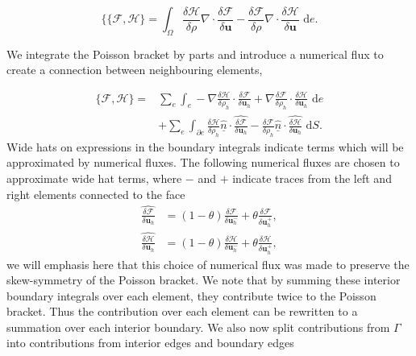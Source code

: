 \documentclass[a4paper,11pt]{article}
\begin{document}
\[ \{  \{ \mathcal{F},  \mathcal{H}\} = \int_\Omega \frac{\delta  \mathcal{H}}{\delta \rho} \nabla \cdot \frac{\delta  \mathcal{F}}{\delta \mathbf{u}} - \frac{\delta  \mathcal{F}}{\delta \rho} \nabla \cdot \frac{\delta  \mathcal{H}}{\delta \mathbf{u}} \text{ d}e.\]

 We integrate the  Poisson bracket by parts and introduce a numerical flux to create a connection between neighbouring elements,

\begin{equation}
\begin{aligned}
 \{ \mathcal{F},  \mathcal{H}\} = & \sum_e \int_e - \nabla \frac{\delta  \mathcal{H}}{\delta \rho_h}\cdot \frac{\delta  \mathcal{F}}{\delta \mathbf{u}_h} + \nabla \frac{\delta  \mathcal{F}}{\delta \rho_h}\cdot \frac{\delta  \mathcal{H}}{\delta \mathbf{u}_h} \text{ d}e \\
 &+ \sum_e \int_{\partial e }  \frac{\delta  \mathcal{H}}{\delta \rho_h}\hat{\underline{n}} \cdot \widehat{\frac{\delta  \mathcal{F}}{\delta \mathbf{u}_h}} - \frac{\delta  \mathcal{F}}{\delta \rho_h}\hat{\underline{n}} \cdot \widehat{\frac{\delta  \mathcal{H}}{\delta \mathbf{u}_h}} \text{ d} S. 
 \end{aligned}
 \end{equation}
 Wide hats on expressions in the boundary integrals indicate terms which will be approximated by numerical fluxes. 
  The  following numerical fluxes are chosen to approximate wide hat terms, where $-$  and $+$ indicate traces from the left and right elements connected to the face
 \begin{equation}
 \begin{aligned}
  \widehat{\frac{\delta  \mathcal{F}}{\delta \mathbf{u}_h}} &= (1-\theta) \frac{\delta  \mathcal{F}}{\delta \mathbf{u}_h^-}+ \theta\frac{\delta  \mathcal{F}}{\delta \mathbf{u}_h^+},  \\
 \widehat{\frac{\delta  \mathcal{H}}{\delta \mathbf{u}_h}}&= (1-\theta) \frac{\delta  \mathcal{H}}{\delta \mathbf{u}_h^-}+ \theta\frac{\delta  \mathcal{H}}{\delta \mathbf{u}_h^+} ,
 \end{aligned}
 \end{equation}
 we will emphasis here that this choice of numerical flux was made to preserve the skew-symmetry of the Poisson bracket.  We note that by summing these interior boundary integrals over each element, they contribute twice to the Poisson bracket. Thus the contribution over each element can be rewritten to a summation over each interior boundary. We also now split contributions from $\Gamma$ into contributions from interior edges and boundary edges
\end{document}
